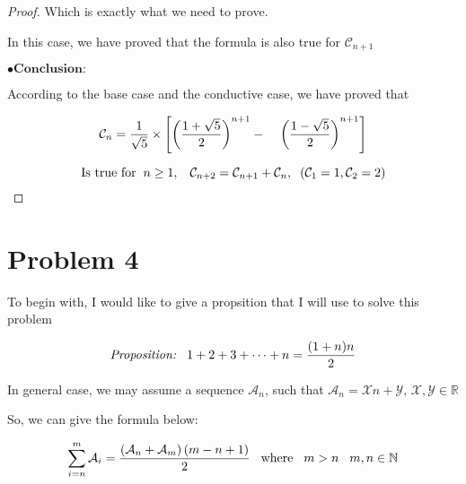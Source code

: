 \documentclass[12pt]{article}
\begin{document}
\begin{proof}
    \vspace*{0.3cm}
    \hspace*{1.2cm}
    Which is exactly what we need to prove.

    \vspace*{0.3cm}
    \hspace*{1.2cm}
    In this case, we have proved that the formula is also true for $\mathcal{C}_{n+1}$

    \newpage
    \hspace*{1.2cm}
    $\bullet \textbf{Conclusion:}$

    \vspace*{0.3cm}
    \hspace*{1.2cm}
    According to the base case and the conductive case, we have proved that

    \[ \mathcal{C}_{n} = \frac{1}{\sqrt{5}} \times \left[ \left( \frac{1+\sqrt{5}}{2} 
    \right)^{n+1} -  \hspace*{0.4cm}\left( \frac{1-\sqrt{5}}{2} \right)^{n+1} \right] \]

    \[ \text{Is true for} \hspace*{0.2cm} n \geq 1, \hspace*{0.3cm} \mathcal{C}_{n+2} =
     \mathcal{C}_{n+1} + \mathcal{C}_{n}, \hspace*{0.2cm} \left( \mathcal{C}_{1} = 1
     , \mathcal{C}_{2} = 2 \right) \]
     
\end{proof}

\newpage
\section*{Problem 4}

\hspace*{0.6cm}To begin with, I would like to give a propsition that I will use to
solve this problem



\[\textit{Proposition:} \hspace*{0.3cm} 
1 + 2+ 3+ \cdots + n = \frac{(1+n)n}{2} \]




In general case, we may assume a sequence $\mathcal{A}_n$, 
such that $\mathcal{A}_n = \mathcal{X}n + \mathcal{Y}$,
$\mathcal{X},\mathcal{Y} \in \mathbb{R}$

\vspace{0.3cm}
So, we can give the formula below:

\[ \sum_{i=n}^{m} \mathcal{A}_i = \frac{\left( 
    \mathcal{A}_n+\mathcal{A}_m \right)(m-n+1)}{2} 
    \hspace*{0.3cm}\text{where} \hspace*{0.3cm}m > n \hspace*{0.3cm} m,n \in \mathbb{N}\]
\end{document}
